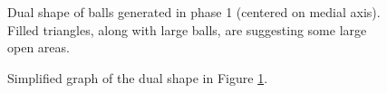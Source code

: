 \documentclass[11pt]{article}
\begin{document}
\begin{figure}
	\caption{\label{ourdualshape}} Dual shape of balls generated in phase 1 (centered on medial axis). Filled triangles, along with large balls, are suggesting some large open areas.  
\end{figure}

\begin{figure}
	\caption{\label{simplifiedgraph}} Simplified graph of the dual shape in Figure \ref{ourdualshape}.
\end{figure}
\end{document}
